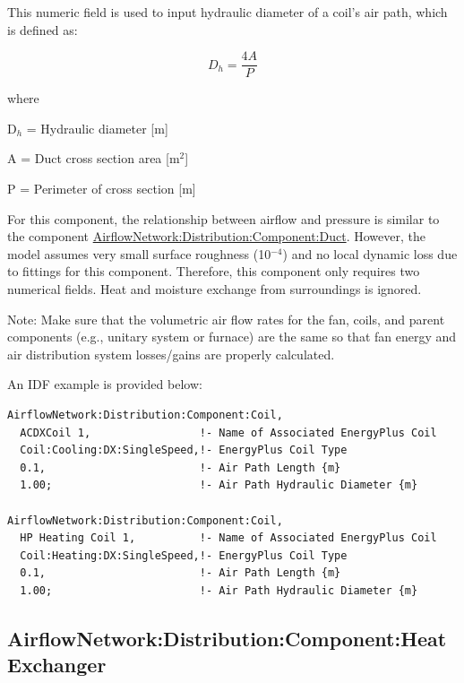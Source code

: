This numeric field is used to input hydraulic diameter of a coil's air path, which is defined as:

\begin{equation}
{D_h} = \frac{{4A}}{P}
\end{equation}

where

D\(_{h}\) = Hydraulic diameter {[}m{]}

A = Duct cross section area {[}m\(^{2}\){]}

P = Perimeter of cross section {[}m{]}

For this component, the relationship between airflow and pressure is similar to the component \hyperref[airflownetworkdistributioncomponentduct]{AirflowNetwork:Distribution:Component:Duct}. However, the model assumes very small surface roughness (10\(^{-4}\)) and no local dynamic loss due to fittings for this component. Therefore, this component only requires two numerical fields. Heat and moisture exchange from surroundings is ignored.

Note: Make sure that the volumetric air flow rates for the fan, coils, and parent components (e.g., unitary system or furnace) are the same so that fan energy and air distribution system losses/gains are properly calculated.

An IDF example is provided below:

\begin{lstlisting}
AirflowNetwork:Distribution:Component:Coil,
  ACDXCoil 1,                 !- Name of Associated EnergyPlus Coil
  Coil:Cooling:DX:SingleSpeed,!- EnergyPlus Coil Type
  0.1,                        !- Air Path Length {m}
  1.00;                       !- Air Path Hydraulic Diameter {m}

AirflowNetwork:Distribution:Component:Coil,
  HP Heating Coil 1,          !- Name of Associated EnergyPlus Coil
  Coil:Heating:DX:SingleSpeed,!- EnergyPlus Coil Type
  0.1,                        !- Air Path Length {m}
  1.00;                       !- Air Path Hydraulic Diameter {m}
\end{lstlisting}

\subsection{AirflowNetwork:Distribution:Component:HeatExchanger}\label{airflownetworkdistributioncomponentheatexchanger}

